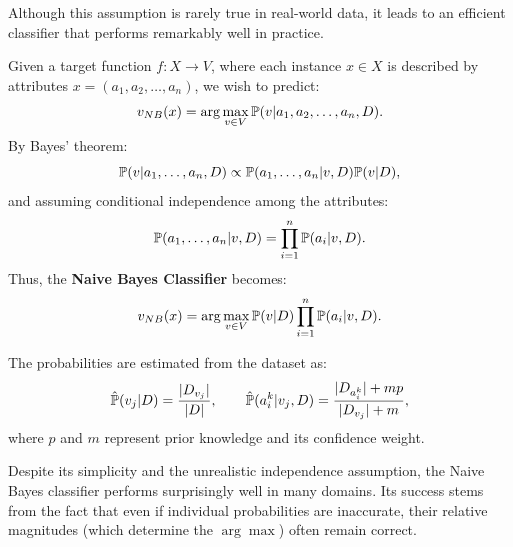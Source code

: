 \documentclass[10pt, letterpaper]{report}
\begin{document}
\noindent
Although this assumption is rarely true in real-world data, it leads to an efficient classifier that performs remarkably well in practice.

\bigskip
\noindent
Given a target function $f: X \rightarrow V$, where each instance $x \in X$ is described by attributes $x=(a_1,a_2,\dots,a_n)$, we wish to predict:
\[
	v_{NB}(x) = \arg\max_{v\in V}{\mathbb P}(v|a_1,a_2,\dots,a_n,D).
\]
By Bayes’ theorem:
\[
	{\mathbb P}(v|a_1,\dots,a_n,D) \propto {\mathbb P}(a_1,\dots,a_n|v,D){\mathbb P}(v|D),
\]
and assuming conditional independence among the attributes:
\[
	{\mathbb P}(a_1,\dots,a_n|v,D) = \prod_{i=1}^n {\mathbb P}(a_i|v,D).
\]
Thus, the \textbf{Naive Bayes Classifier} becomes:
\[
	v_{NB}(x) = \arg\max_{v\in V}{\mathbb P}(v|D)\prod_{i=1}^n{\mathbb P}(a_i|v,D).
\]

\bigskip
\noindent
The probabilities are estimated from the dataset as:
\[
	\hat{{\mathbb P}}(v_j|D)=\frac{|D_{v_j}|}{|D|}, \qquad
	\hat{{\mathbb P}}(a_i^k|v_j,D)=\frac{|D_{a_i^k}|+mp}{|D_{v_j}|+m},
\]
where $p$ and $m$ represent prior knowledge and its confidence weight.

\bigskip
\noindent
Despite its simplicity and the unrealistic independence assumption, the Naive Bayes classifier performs surprisingly well in many domains.
Its success stems from the fact that even if individual probabilities are inaccurate, their relative magnitudes (which determine the $\arg\max$) often remain correct.
\end{document}

